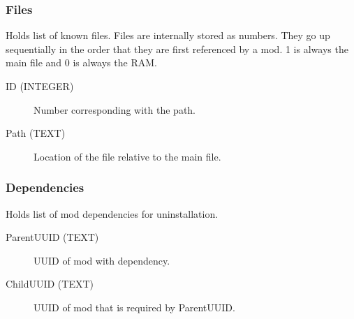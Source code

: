 \subsubsection{Files}
Holds list of known files. Files are internally stored as numbers. They go up sequentially in the order that they are first referenced by a mod.  1 is always the main file and 0 is always the RAM.

\begin{description}
\item[ID (INTEGER)] Number corresponding with the path.
\item[Path (TEXT)] Location of the file relative to the main file.
\end{description}

\subsubsection{Dependencies}
Holds list of mod dependencies for uninstallation.

\begin{description}
\item[ParentUUID (TEXT)] UUID of mod with dependency.
\item[ChildUUID (TEXT)] UUID of mod that is required by ParentUUID.
\end{description}
